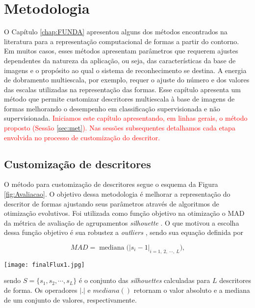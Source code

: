 \chapter{Metodologia}
\label{chap:MatMet}

O Capítulo \ref{chap:FUNDA} apresentou alguns dos métodos encontrados na literatura para a representação computacional de formas a partir do contorno.  Em muitos casos, esses métodos apresentam parâmetros que requerem ajustes dependentes da natureza da aplicação, ou seja,  das características da base de imagens e o propósito ao qual o sistema de reconhecimento se destina. A energia de dobramento multiescala, por exemplo, requer o ajuste do número e dos valores das escalas utilizadas na representação das formas. 
Esse capítulo apresenta um método que permite customizar descritores multiescala à base de imagens de formas melhorando o desempenho em classificação supervisionada e não supervisionada. 
\textcolor{red}{
Iniciamos este capítulo apresentando, em linhas gerais, o método proposto (Sessão \ref{sec:met}). Nas sessões subsequentes detalhamos cada etapa envolvida no processo de customização do descritor. 
}

\section{Customização de descritores\label{sec:met}}
O método para customização de descritores segue o esquema da Figura \ref{fig:Avaliacao}. O objetivo dessa metodologia é melhorar a representação do descritor de formas ajustando seus parâmetros através de algoritmos de otimização evolutivos. Foi utilizada como função objetivo na otimização o \ac{MAD} da métrica de avaliação de agrupamentos \textit{silhouette} \cite{Rousseeuw:1987}. O que motivou a escolha dessa função objetivo é sua robustez a \textit{outliers} \cite{Rousseeuw:1987:2}, sendo sua equação definida por

\begin{equation}
\label{eq:mad}
MAD = \operatorname{mediana}\big(|s_i - 1|_{i =1,\:2,\:\cdots,\:L}\big)\text{,}
\end{equation}

\begin{figure*}[ht]
\caption{\label{fig:Avaliacao}
 Proposta de uma metodologia para otimização evolucionária de um descritor multiescala de forma.} 
\centering
\texttt{[image: finalFlux1.jpg]}
\end{figure*}

\noindent sendo $S = \{s_1,s_2,\cdots,s_L\}$ é o conjunto das \emph{silhouettes} calculadas para $L$ descritores de forma. Os operadores $|.|$  e {$mediana ( )$} retornam o valor absoluto e a mediana de um conjunto de valores, respectivamente.

